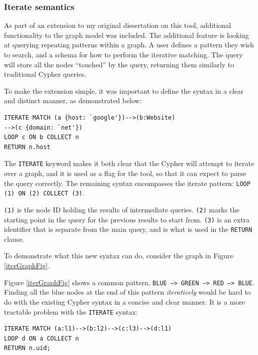 \documentclass[letterpaper]{ltxdoc}
\begin{document}
\subsubsection{Iterate semantics}
\label{sssec:iterate}
As part of an extension to my original dissertation on this tool, additional functionality to the graph model was included. The additional feature is looking at querying repeating patterns within a graph. A user defines a pattern they wish to search, and a schema for how to perform the iterative matching. The query will store all the nodes “touched” by the query, returning them similarly to traditional Cypher queries.

To make the extension simple, it was important to define the syntax in a clear and distinct manner, as demonstrated below:

\begin{lstlisting}[language=Cypher]
ITERATE MATCH (a {host: `google'})-->(b:Website)
-->(c {domain: `net'})
LOOP c ON b COLLECT n
RETURN n.host
\end{lstlisting}

The \texttt{ITERATE} keyword makes it both clear that the Cypher will attempt to iterate over a graph, and it is used as a flag for the tool, so that it can expect to parse the query correctly. The remaining syntax encompasses the iterate pattern: \texttt{LOOP (1) ON (2) COLLECT (3)}.

\texttt{(1)} is the node ID holding the results of intermediate queries. \texttt{(2)} marks the starting point in the query for the previous results to start from. \texttt{(3)} is an extra identifier that is separate from the main query, and is what is used in the \texttt{RETURN} clause.

To demonstrate what this new syntax can do, consider the graph in Figure \ref{iterGraphFig}.

Figure \ref{iterGraphFig} shows a common pattern, \texttt{BLUE --> GREEN --> RED --> BLUE}. Finding all the blue nodes at the end of this pattern \emph{iteratively} would be hard to do with the existing Cypher syntax in a concise and clear manner. It is a more tractable problem with the \texttt{ITERATE} syntax:

\begin{lstlisting}[language = Cypher]
ITERATE MATCH (a:l1)-->(b:l2)-->(c:l3)-->(d:l1)
LOOP d ON a COLLECT n
RETURN n.uid;
\end{lstlisting}
\end{document}
